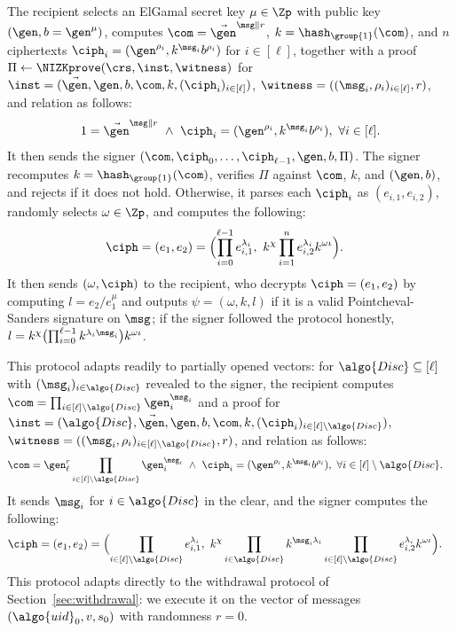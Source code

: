 The recipient selects an ElGamal secret key $\mu \in \Zp$ with public key
$(\gen, b = \gen^\mu)$, computes $\com = \vec{\gen}^{\msg\|r}$, $k =
\hash_{\group{1}}(\com)$, and $n$ ciphertexts $\ciph_i = (\gen^{\rho_i},
k^{\msg_i} b^{\rho_i})$ for $i \in [\ell]$, together with a proof $\Pi
\leftarrow \NIZKprove(\crs, \inst, \witness)$ for $\inst = (\vec{\gen}, \gen,
b, \com, k, (\ciph_i)_{i \in [\ell]})$, $\witness = ((\msg_i, \rho_i)_{i \in
[\ell]}, r)$, and relation as follows:
%
\begin{align*}
%
  1 = \vec{\gen}^{\msg\|r} \ \wedge \ \ciph_i = (\gen^{\rho_i},
  k^{\msg_i}b^{\rho_i}), \ \forall i \in [\ell].
\end{align*}
%
It then sends the signer $(\com, \ciph_0, \ldots, \ciph_{\ell-1}, \gen, b,
\Pi)$. The signer recomputes $k = \hash_{\group{1}}(\com)$, verifies $\Pi$
against $\com$, $k$, and $(\gen, b)$, and rejects if it does not hold.
Otherwise, it parses each $\ciph_i$ as $(e_{i,1}, e_{i,2})$, randomly selects
$\omega \in \Zp$, and computes the following:
%
\begin{align*}
%
  \ciph &= (e_1, e_2) = \Bigl(\prod_{i=0}^{\ell-1} e_{i,1}^{\lambda_i}, \
  k^\chi \prod_{i=1}^n e_{i,2}^{\lambda_i} k^{\omega\iota}\Bigr).
  \end{align*}
%
  It then sends $(\omega, \ciph)$ to the recipient, who decrypts $\ciph = (e_1,
  e_2)$ by computing $l = e_2 / e_1^\mu$ and outputs $\psi = (\omega, k, l)$ if
  it is a valid Pointcheval-Sanders signature on $\msg$; if the signer followed
  the protocol honestly, $l = k^\chi \bigl(\prod_{i=0}^{\ell-1} k^{\lambda_i
  \msg_i}\bigr) k^{\omega\iota}$.

  This protocol adapts readily to partially opened vectors: for $\algo{Disc}
  \subseteq [\ell]$ with $(\msg_i)_{i \in \algo{Disc}}$ revealed to the signer,
  the recipient computes $\com = \prod_{i \in [\ell]\setminus\algo{Disc}}
  \gen_i^{\msg_i}$ and a proof for $\inst = (\algo{Disc}, \vec{\gen}, \gen, b,
  \com, k, (\ciph_i)_{i \in [\ell]\setminus\algo{Disc}})$, $\witness =
  ((\msg_i, \rho_i)_{i \in [\ell]\setminus\algo{Disc}}, r)$, and relation as
  follows:
%
  \begin{align*}
%
    \com &= \gen_\ell^r \prod_{i \in [\ell]\setminus\algo{Disc}}
    \gen_i^{\msg_i} \ \wedge \ \ciph_i = (\gen^{\rho_i}, k^{\msg_i}
    b^{\rho_i}), \ \forall i \in [\ell]\setminus\algo{Disc}.
  \end{align*}
%
  It sends $\msg_i$ for $i \in \algo{Disc}$ in the clear, and the signer
  computes the following:
%
  \begin{align*}
%
    \ciph &= (e_1, e_2) = \Bigl(\prod_{i \in [\ell]\setminus\algo{Disc}}
    e_{i,1}^{\lambda_i}, \ k^\chi \prod_{i \in \algo{Disc}} k^{\msg_i
  \lambda_i} \prod_{i \in [\ell]\setminus\algo{Disc}} e_{i,2}^{\lambda_i}
k^{\omega\iota}\Bigr).
    \end{align*}
%
    This protocol adapts directly to the withdrawal protocol of
    Section~\ref{sec:withdrawal}: we execute it on the vector of messages
    $(\algo{uid}_0, v, s_0)$ with randomness $r = 0$.

